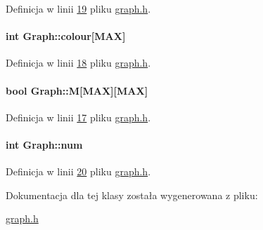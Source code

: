 Definicja w linii \hyperlink{graph_8h_source_l00019}{19} pliku \hyperlink{graph_8h_source}{graph.\-h}.

\hypertarget{class_graph_aa13a7c7c066a77cc6dd21e4380deb649}{
\paragraph[{colour}]{\setlength{\rightskip}{0pt plus 5cm}int Graph\-::colour\mbox{[}{\bf M\-A\-X}\mbox{]}}}\label{class_graph_aa13a7c7c066a77cc6dd21e4380deb649}


Definicja w linii \hyperlink{graph_8h_source_l00018}{18} pliku \hyperlink{graph_8h_source}{graph.\-h}.

\hypertarget{class_graph_ae948381c05ffc60825e5810328c0451c}{
\paragraph[{M}]{\setlength{\rightskip}{0pt plus 5cm}bool Graph\-::\-M\mbox{[}{\bf M\-A\-X}\mbox{]}\mbox{[}{\bf M\-A\-X}\mbox{]}}}\label{class_graph_ae948381c05ffc60825e5810328c0451c}


Definicja w linii \hyperlink{graph_8h_source_l00017}{17} pliku \hyperlink{graph_8h_source}{graph.\-h}.

\hypertarget{class_graph_a895fee5bcf86093c8f57de9ed2304d8e}{
\paragraph[{num}]{\setlength{\rightskip}{0pt plus 5cm}int Graph\-::num}}\label{class_graph_a895fee5bcf86093c8f57de9ed2304d8e}


Definicja w linii \hyperlink{graph_8h_source_l00020}{20} pliku \hyperlink{graph_8h_source}{graph.\-h}.



Dokumentacja dla tej klasy została wygenerowana z pliku\-:\begin{DoxyCompactItemize}
\item 
\hyperlink{graph_8h}{graph.\-h}\end{DoxyCompactItemize}
